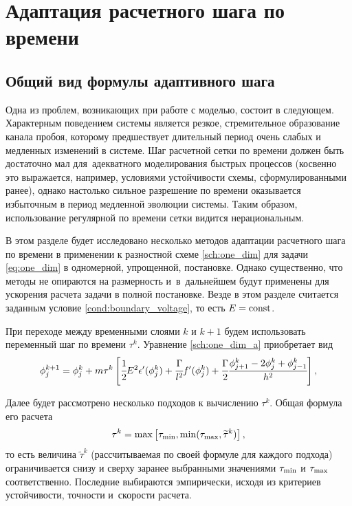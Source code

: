 
\section{Адаптация расчетного шага по времени}
\label{sec:adaptation}

\subsection{Общий вид формулы адаптивного шага}

Одна из проблем, возникающих при работе с моделью, состоит в следующем. Характерным поведением системы является резкое, стремительное образование канала пробоя, которому предшествует длительный период очень слабых и медленных изменений в системе. Шаг расчетной сетки по времени должен быть достаточно мал для~адекватного моделирования быстрых процессов (косвенно это выражается, например, условиями устойчивости схемы, сформулированными ранее), однако настолько сильное разрешение по времени оказывается избыточным в период медленной эволюции системы. Таким образом, использование регулярной по времени сетки видится нерациональным.

В этом разделе будет исследовано несколько методов адаптации расчетного шага по времени в применении к разностной схеме \eqref{sch:one_dim} для задачи \eqref{eq:one_dim} в одномерной, упрощенной, постановке. Однако существенно, что методы не опираются на размерность и~в~дальнейшем будут применены для ускорения расчета задачи в полной постановке. Везде в этом разделе считается заданным условие \eqref{cond:boundary_voltage}, то есть $E = \operatorname{{const}}$.

При переходе между временными слоями $k$ и $k + 1$ будем использовать переменный шаг по времени $\tau^k$. Уравнение \eqref{sch:one_dim_a} приобретает вид
\begin{equation}
    \phi_j^{k + 1} = \phi_j^k + m \tau^k \left[ \cfrac{1}{2} E^2 \epsilon'(\phi_j^k) + \cfrac{\Gamma}{l^2} f'(\phi_j^k) + \cfrac{\Gamma}{2} \cfrac{\phi_{j + 1}^k - 2 \phi_j^k + \phi_{j - 1}^k}{h^2} \right],
    \label{sch:transition_adaptive}
\end{equation}

Далее будет рассмотрено несколько подходов к вычислению $\tau^k$. Общая формула его расчета
\begin{equation}
    \tau^k = \max \left[ {\tau_\text{min}}, \min( {\tau_\text{max}}, \widetilde{\tau}^k) \right],
    \label{sch:time_step_min_max}
\end{equation}
то есть величина $\widetilde{\tau}^k$ (рассчитываемая по своей формуле для каждого подхода) ограничивается снизу и сверху заранее выбранными значениями ${\tau_\text{min}}$ и ${\tau_\text{max}}$ соответственно. Последние выбираются эмпирически, исходя из критериев устойчивости, точности и~скорости расчета.


